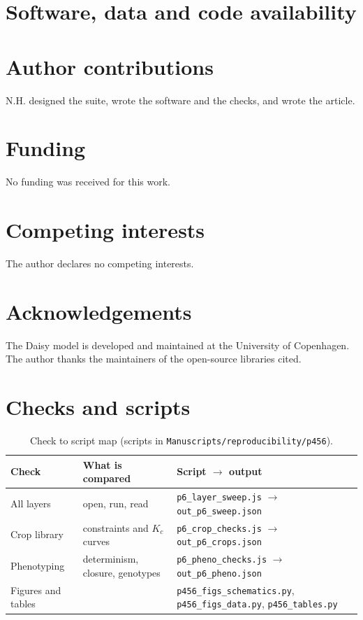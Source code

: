 \section*{Software, data and code availability}
\suiteavail
\section*{Author contributions}
N.H. designed the suite, wrote the software and the checks, and wrote the article.
\section*{Funding}
No funding was received for this work.
\section*{Competing interests}
The author declares no competing interests.

\section*{Acknowledgements}
The Daisy model is developed and maintained at the University of Copenhagen. The author thanks the maintainers of the open-source libraries cited.



\appendix
\section{Checks and scripts}\label{app:repro6}
\begin{table}[H]\centering\small
\caption{Check to script map (scripts in \texttt{Manuscripts/reproducibility/p456}).}
\begin{tabularx}{\textwidth}{>{\raggedright\arraybackslash}p{4.2cm}>{\raggedright\arraybackslash}p{4.0cm}X}
\toprule Check & What is compared & Script $\to$ output\\\midrule
All layers & open, run, read & \texttt{p6\_layer\_sweep.js} $\to$ \texttt{out\_p6\_sweep.json}\\
Crop library & constraints and $K_c$ curves & \texttt{p6\_crop\_checks.js} $\to$ \texttt{out\_p6\_crops.json}\\
Phenotyping & determinism, closure, genotypes & \texttt{p6\_pheno\_checks.js} $\to$ \texttt{out\_p6\_pheno.json}\\
Figures and tables & & \texttt{p456\_figs\_schematics.py}, \texttt{p456\_figs\_data.py}, \texttt{p456\_tables.py}\\\bottomrule
\end{tabularx}
\end{table}

